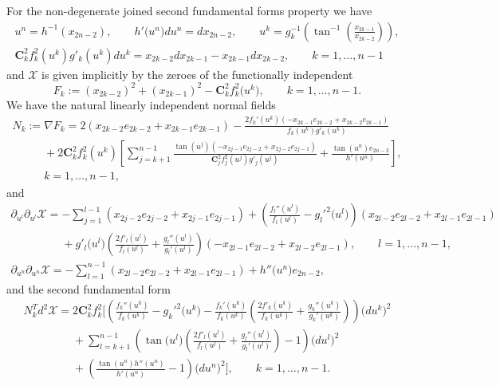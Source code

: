\documentclass[pdftex]{sigma}
\begin{document}
For the non-degenerate joined second fundamental forms property we
have
\begin{gather*}
u^n=h^{-1}(x_{2n-2}),\qquad h'\big(u^n\big)du^n=dx_{2n-2},\qquad
u^k=g_k^{-1}\left(\tan^{-1}\left(\frac{x_{2k-1}}{x_{2k-2}}\right)\right),
\\
\mathbf{C}_k^2f_k^2(u^k)g'_k(u^k)du^k=x_{2k-2}dx_{2k-1}-x_{2k-1}dx_{2k-2},
\qquad k=1,\dots ,n-1
\end{gather*}
and $\mathcal{X}$ is given implicitly by the zeroes of the
functionally independent
\[
F_k:=(x_{2k-2})^2+(x_{2k-1})^2-\mathbf{C}_k^2f_k^2\big(u^k\big),\qquad
k=1,\dots ,n-1.
\]
We have the natural linearly independent normal f\/ields
\begin{gather*}
N_k:=\nabla F_k=2(x_{2k-2}e_{2k-2}+x_{2k-1}e_{2k-1})
-\frac{2f_k'(u^k)(-x_{2k-1}e_{2k-2}+x_{2k-2}e_{2k-1})}{f_k(u^k)g'_k(u^k)}
\\
\phantom{N_k:=}{} +2\mathbf{C}_k^2f_k^2(u^k)\left[\sum_{j=k+1}^{n-1}\frac{\tan(u^j)
(-x_{2j-1}e_{2j-2}+x_{2j-2}e_{2j-1})}
{\mathbf{C}_j^2f_j^2(u^j)g'_j(u^j)}+\frac{\tan(u^n)e_{2n-2}}{h'(u^n)}\right],\\
\phantom{N_k:=}{} k=1,\dots ,n-1,
\end{gather*} and
\begin{gather*}
\partial_{u^l}\partial_{u^l}\mathcal{X}=-\sum_{j=1}^{l-1}(x_{2j-2}e_{2j-2}+x_{2j-1}e_{2j-1})
+\left(\frac{f_l''(u^l)}{f_l(u^l)}-g_l'^2\big(u^l\big)\right)(x_{2l-2}e_{2l-2}+x_{2l-1}e_{2l-1})
\\
\phantom{\partial_{u^l}\partial_{u^l}\mathcal{X}=}{} +g'_l\big(u^l\big)\left(\frac{2f'_l(u^l)}{f_l(u^l)}+\frac{g_l''(u^l)}{g_l'(u^l)}\right)
(-x_{2l-1}e_{2l-2}+x_{2l-2}e_{2l-1}),\qquad l=1,\dots ,n-1,
\\
\partial_{u^n}\partial_{u^n}\mathcal{X}=-\sum_{l=1}^{n-1}(x_{2l-2}e_{2l-2}+x_{2l-1}e_{2l-1})
+h''\big(u^n\big)e_{2n-2},
\end{gather*}
and the second fundamental form
\begin{gather*}
N_k^Td^2\mathcal{X}=2\mathbf{C}_k^2f_k^2\Bigg[\left(\frac{f_k''(u^k)}{f_k(u^k)}-g_k'^2\big(u^k\big)
-\frac{f_k'(u^k)}{f_k(u^k)}\left(\frac{2f'_k(u^k)}{f_k(u^k)}+
\frac{g_k''(u^k)}{g_k'(u^k)}\right)\right)\big(du^k\big)^2
\\
\phantom{N_k^Td^2\mathcal{X}=}{}
+\sum_{l=k+1}^{n-1}\left(\tan\big(u^l\big)\left(\frac{2f'_l(u^l)}{f_l(u^l)}
+\frac{g_l''(u^l)}{g_l'(u^l)}\right)-1\right)\big(du^l\big)^2\\
\phantom{N_k^Td^2\mathcal{X}=}{}
+\left(\frac{\tan(u^n)h''(u^n)}{h'(u^n)}-1\right)\big(du^n\big)^2\Bigg],\qquad k=1,\dots ,n-1.
\end{gather*}
\end{document}
